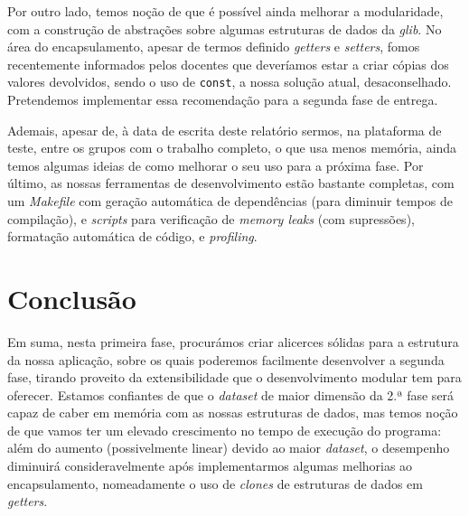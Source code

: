 \documentclass[12pt, a4paper]{article}
\begin{document}
Por outro lado, temos noção de que é possível ainda melhorar a modularidade, com a construção de
abstrações sobre algumas estruturas de dados da \emph{glib}. No área do encapsulamento, apesar de
termos definido \emph{getters} e \emph{setters}, fomos recentemente informados pelos docentes que
deveríamos estar a criar cópias dos valores devolvidos, sendo o uso de \texttt{const}, a nossa
solução atual, desaconselhado. Pretendemos implementar essa recomendação para a segunda fase de
entrega.

Ademais, apesar de, à data de escrita deste relatório sermos, na plataforma de teste, entre os
grupos com o trabalho completo, o que usa menos memória, ainda temos algumas ideias de como melhorar
o seu uso para a próxima fase. Por último, as nossas ferramentas de desenvolvimento estão bastante
completas, com um \emph{Makefile} com geração automática de dependências (para diminuir tempos de
compilação), e \emph{scripts} para verificação de \emph{memory leaks} (com supressões), formatação
automática de código, e \emph{profiling}.

\section{Conclusão}

Em suma, nesta primeira fase, procurámos criar alicerces sólidas para a estrutura da nossa
aplicação, sobre os quais poderemos facilmente desenvolver a segunda fase, tirando proveito da
extensibilidade que o desenvolvimento modular tem para oferecer. Estamos confiantes de que o
\emph{dataset} de maior dimensão da 2.ª fase será capaz de caber em memória com as nossas estruturas
de dados, mas temos noção de que vamos ter um elevado crescimento no tempo de execução do programa:
além do aumento (possivelmente linear) devido ao maior \emph{dataset}, o desempenho diminuirá
consideravelmente após implementarmos algumas melhorias ao encapsulamento, nomeadamente o uso de
\emph{clones} de estruturas de dados em \emph{getters}.
\end{document}
